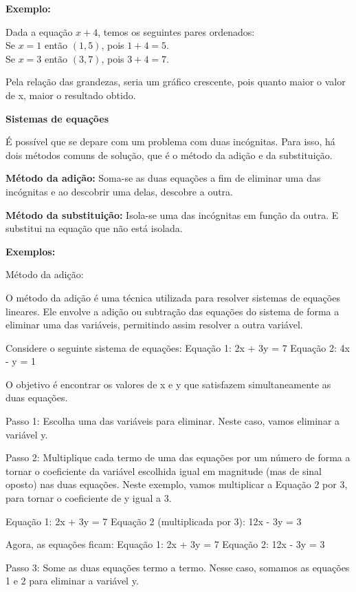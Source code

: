 \textbf{Exemplo:}

Dada a equação $x + 4$, temos os seguintes pares ordenados: \\

Se $x = 1$ então $(1,5)$, pois $1 + 4 = 5$. \\

Se $x = 3$ então $(3,7)$, pois $3 + 4 = 7$.

Pela relação das grandezas, seria um gráfico crescente, pois quanto
maior o valor de x, maior o resultado obtido.

\textbf{Sistemas de equações}

É possível que se depare com um problema com duas incógnitas. Para isso,
há dois métodos comuns de solução, que é o método da adição e da
substituição.

\textbf{Método da adição:} Soma-se as duas equações a fim de eliminar
uma das incógnitas e ao descobrir uma delas, descobre a outra.

\textbf{Método da substituição:} Isola-se uma das incógnitas em função
da outra. E substitui na equação que não está isolada.

\textbf{Exemplos:}

Método da adição:

O método da adição é uma técnica utilizada para resolver sistemas de
equações lineares. Ele envolve a adição ou subtração das equações do
sistema de forma a eliminar uma das variáveis, permitindo assim resolver
a outra variável.

Considere o seguinte sistema de equações: Equação 1: 2x + 3y = 7 Equação
2: 4x - y = 1

O objetivo é encontrar os valores de x e y que satisfazem
simultaneamente as duas equações.

Passo 1: Escolha uma das variáveis para eliminar. Neste caso, vamos
eliminar a variável y.

Passo 2: Multiplique cada termo de uma das equações por um número de
forma a tornar o coeficiente da variável escolhida igual em magnitude
(mas de sinal oposto) nas duas equações. Neste exemplo, vamos
multiplicar a Equação 2 por 3, para tornar o coeficiente de y igual a 3.

Equação 1: 2x + 3y = 7 Equação 2 (multiplicada por 3): 12x - 3y = 3

Agora, as equações ficam: Equação 1: 2x + 3y = 7 Equação 2: 12x - 3y = 3

Passo 3: Some as duas equações termo a termo. Nesse caso, somamos as
equações 1 e 2 para eliminar a variável y.


